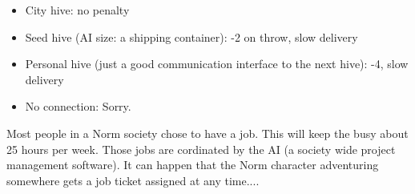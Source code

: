 \begin{itemize}
    \item City hive: no penalty
    \item Seed hive (AI size: a shipping container): -2 on throw, slow delivery
    \item Personal hive (just a good communication interface to the next hive): -4, slow delivery
    \item No connection: Sorry.    
\end{itemize}

Most people in a Norm society chose to have a job. This will keep the busy about 25 hours per week. Those jobs are cordinated by the AI (a society wide project management software). It can happen that the Norm character adventuring somewhere gets a job ticket assigned at any time....

